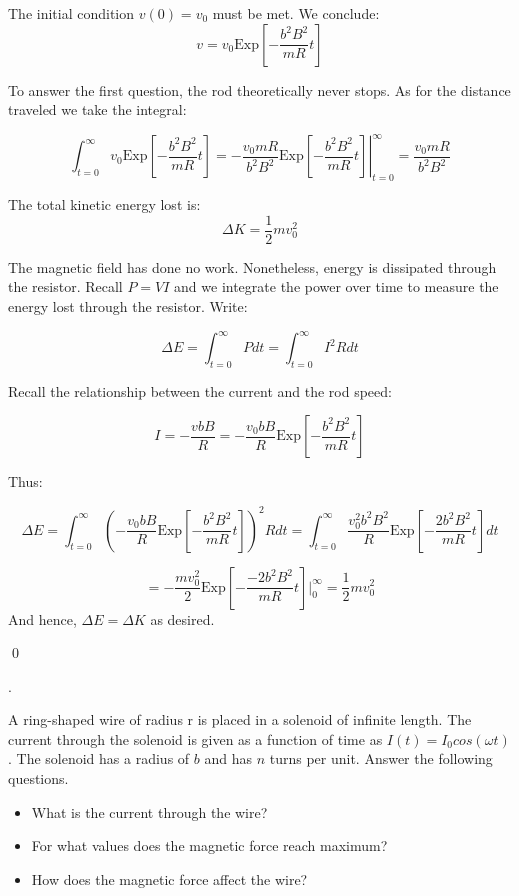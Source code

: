 \documentclass{article}
\newcounter{problemcnt}
\newcommand{\Problem}{{
    \vspace{5mm}
    \stepcounter{problemcnt}
    \noindent
    \arabic{problemcnt}. 
}
}
\begin{document}
The initial condition $v(0) = v_0$ must be met. We conclude:
\[
    v = v_0\textrm{Exp}\left[
-\frac{b^2B^2}{mR}t
    \right]
\]

To answer the first question, the rod theoretically never stops. 
As for the distance traveled we take the integral:

\[
    \int_{t = 0}^{\infty} v_0\textrm{Exp}\left[
-\frac{b^2B^2}{mR}t
    \right]
    = 
    \left.
        -
        \frac{v_0mR}
        {b^2B^2}
        \textrm{Exp}\left[
-\frac{b^2B^2}{mR}t
    \right]
    \right|_{t = 0}^{{\infty}}
     = 
     \boxed{
     \frac{v_0mR}{b^2B^2}
     }
\]

The total kinetic energy lost is:
\[
    \Delta K = 
    \frac{1}{2} mv_0^2
\]

The magnetic field has done no work. Nonetheless, 
energy is dissipated through the resistor. Recall
$P = VI$ and we integrate the power over time to 
measure the energy lost through the resistor. Write:

\[
    \Delta E = \int_{t = 0}^{\infty} Pdt = 
    \int_{t = 0}^{\infty} I^2Rdt 
\]

Recall the relationship between the current and 
the rod speed:

\[
    I = -\frac{vbB}{R}
    =
    -\frac{v_0bB}{R}\textrm{Exp}\left[
-\frac{b^2B^2}{mR}t
    \right]
\]

Thus:

\[
    \Delta E =  \int_{t = 0}^{\infty}
    \left(
    -\frac{v_0bB}{R}\textrm{Exp}\left[
-\frac{b^2B^2}{mR}t
\right]
\right)^2Rdt
= \int_{t = 0}^{\infty}
    \frac{v_0^2b^2B^2}{R}\textrm{Exp}\left[
-\frac{2b^2B^2}{mR}t
\right]
dt
\]

\[
    =-\frac{mv_0^2}{2}\textrm{Exp}
    \left[
        -\frac{-2b^2B^2}{mR}t
    \right] 
    \bigg|^\infty_0
     = \frac{1}{2}mv_0^2
\]
And hence, $\Delta E = \Delta K$ as desired. 

\qed

\Problem
A ring-shaped wire of radius r is placed in a solenoid of 
infinite length. The current through the solenoid is given 
as a function of time as $I(t)=I_0cos(\omega t)$. The solenoid 
has a radius of $b$ and has $n$ turns per unit. Answer the following 
questions. 
\begin{itemize}
    \item What is the current through the wire?
    \item For what values does the magnetic force reach maximum?
    \item How does the magnetic force affect the wire?   
\end{itemize}
\end{document}
